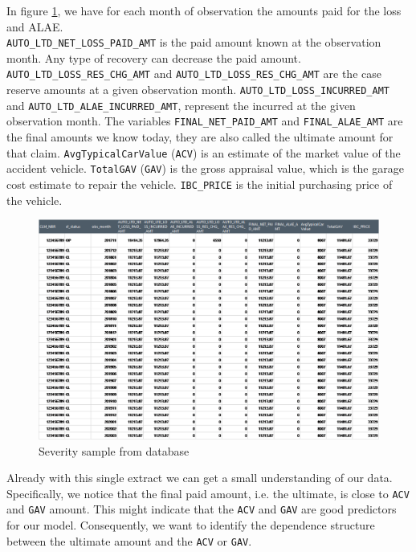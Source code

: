 	In figure \ref{Fig_sample_2}, we have for each month of observation the amounts paid for the loss and ALAE.\\
	\texttt{AUTO\_LTD\_NET\_LOSS\_PAID\_AMT} is the paid amount known at the observation month. Any type of recovery can decrease the paid amount. \texttt{AUTO\_LTD\_LOSS\_RES\_CHG\_AMT} and \texttt{AUTO\_LTD\_LOSS\_RES\_CHG\_AMT} are the case reserve amounts at a given observation month. \texttt{AUTO\_LTD\_LOSS\_INCURRED\_AMT} and \texttt{AUTO\_LTD\_ALAE\_INCURRED\_AMT}, represent the incurred at the given observation month. The variables \texttt{FINAL\_NET\_PAID\_AMT} and \texttt{FINAL\_ALAE\_AMT} are the final amounts we know today, they are also called the ultimate amount for that claim. \texttt{AvgTypicalCarValue} (\texttt{ACV}) is an estimate of the market value of the accident vehicle. \texttt{TotalGAV} (\texttt{GAV}) is the gross appraisal value, which is the garage cost estimate to repair the vehicle. \texttt{IBC\_PRICE} is the initial purchasing price of the vehicle.\\
	\begin{figure}[H]
		\begin{center}
			\includegraphics[scale=0.4]{Graphiques/sample_2} 
			\renewcommand{\figurename}{Figure}
			\caption{Severity sample from database}\label{Fig_sample_2}
		\end{center}
	\end{figure}

	Already with this single extract we can get a small understanding of our data. Specifically, we notice that the final paid amount, i.e. the ultimate, is close to \texttt{ACV} and \texttt{GAV} amount. This might indicate that the \texttt{ACV} and \texttt{GAV} are good predictors for our model. Consequently, we want to identify the dependence structure between the ultimate amount and the \texttt{ACV} or \texttt{GAV}. \\
	
